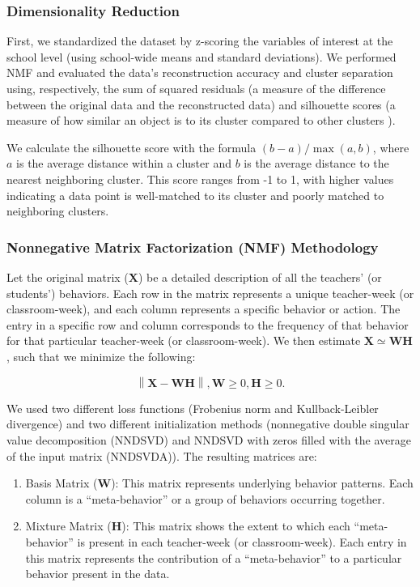 \documentclass[
  number,
  preprint,
  3p,
  onecolumn]{elsarticle}
\providecommand{\tightlist}{%
  \setlength{\itemsep}{0pt}\setlength{\parskip}{0pt}}
\begin{document}
\subsubsection{Dimensionality
Reduction}\label{dimensionality-reduction-1}

First, we standardized the dataset by z-scoring the variables of
interest at the school level (using school-wide means and standard
deviations). We performed NMF and evaluated the data's reconstruction
accuracy and cluster separation using, respectively, the sum of squared
residuals (a measure of the difference between the original data and the
reconstructed data) and silhouette scores (a measure of how similar an
object is to its cluster compared to other clusters
\citep{rousseeuw1987}).

We calculate the silhouette score with the formula
\((b - a) / \max(a, b)\), where \(a\) is the average distance within a
cluster and \(b\) is the average distance to the nearest neighboring
cluster. This score ranges from -1 to 1, with higher values indicating a
data point is well-matched to its cluster and poorly matched to
neighboring clusters.

\subsubsection{Nonnegative Matrix Factorization (NMF)
Methodology}\label{nonnegative-matrix-factorization-nmf-methodology}

Let the original matrix (\(\mathbf{X}\)) be a detailed description of
all the teachers' (or students') behaviors. Each row in the matrix
represents a unique teacher-week (or classroom-week), and each column
represents a specific behavior or action. The entry in a specific row
and column corresponds to the frequency of that behavior for that
particular teacher-week (or classroom-week). We then estimate
\(\mathbf{X} \simeq \mathbf{W}\mathbf{H}\), such that we minimize the
following:

\[
\left\| \mathbf{X} - \mathbf{W}\mathbf{H} \right\| , \mathbf{W} \geq 0, \mathbf{H} \geq 0.
\]

We used two different loss functions (Frobenius norm and
Kullback-Leibler divergence) and two different initialization methods
(nonnegative double singular value decomposition (NNDSVD) and NNDSVD
with zeros filled with the average of the input matrix (NNDSVDA)). The
resulting matrices are:

\begin{enumerate}
\def\labelenumi{\arabic{enumi}.}
\tightlist
\item
  Basis Matrix (\(\mathbf{W}\)): This matrix represents underlying
  behavior patterns. Each column is a ``meta-behavior'' or a group of
  behaviors occurring together.
\item
  Mixture Matrix (\(\mathbf{H}\)): This matrix shows the extent to which
  each ``meta-behavior'' is present in each teacher-week (or
  classroom-week). Each entry in this matrix represents the contribution
  of a ``meta-behavior'' to a particular behavior present in the data.
\end{enumerate}
\end{document}

